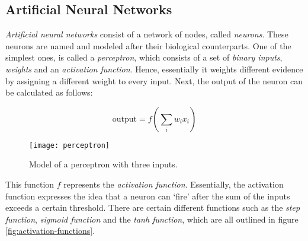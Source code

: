 \subsection{Artificial Neural Networks}

\textit{Artificial neural networks} consist of a network of nodes, called \textit{neurons}.
These neurons are named and modeled after their biological counterparts.
One of the simplest ones, is called a \textit{perceptron}, which consists of a set of \textit{binary inputs}, \textit{weights} and an \textit{activation function}.
Hence, essentially it weights different evidence by assigning a different weight to every input.
Next, the output of the neuron can be calculated as follows:

$$\text{output} = f(\sum_{i} w_i x_i)$$

\begin{figure}[ht]
  \centering
  \texttt{[image: perceptron]}
  \caption{Model of a perceptron with three inputs.}
  \label{fig:perceptron}
\end{figure}

This function $f$ represents the \textit{activation function}.
Essentially, the activation function expresses the idea that a neuron can `fire' after the sum of the inputs exceeds a certain threshold.
There are certain different functions such as the \textit{step function}, \textit{sigmoid function} and the \textit{tanh function},
which are all outlined in figure \ref{fig:activation-functions}.

